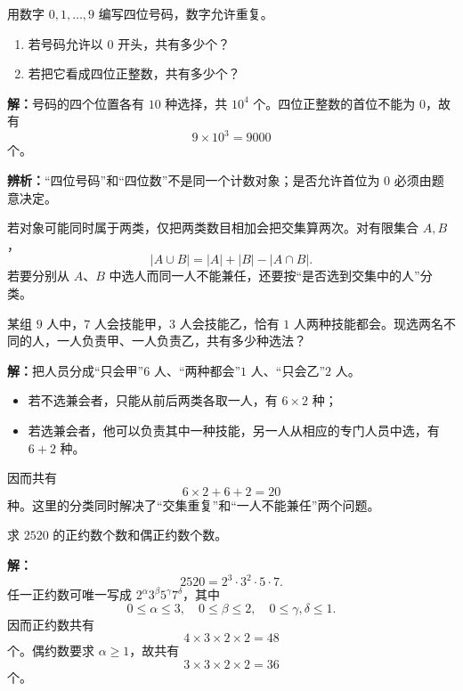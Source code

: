 \begin{examplebox}
  用数字 $0,1,\ldots,9$ 编写四位号码，数字允许重复。
  \begin{enumerate}
    \item 若号码允许以 $0$ 开头，共有多少个？
    \item 若把它看成四位正整数，共有多少个？
  \end{enumerate}

  \textbf{解：}号码的四个位置各有 $10$ 种选择，共 $10^4$ 个。四位正整数的首位不能为 $0$，故有
  \[
    9\times10^3=9000
  \]
  个。

  \textbf{辨析：}“四位号码”和“四位数”不是同一个计数对象；是否允许首位为 $0$ 必须由题意决定。
\end{examplebox}

\begin{corollarybox}[交集不能被重复计数]
  若对象可能同时属于两类，仅把两类数目相加会把交集算两次。对有限集合 $A,B$，
  \[
    |A\cup B|=|A|+|B|-|A\cap B|.
  \]
  若要分别从 $A$、$B$ 中选人而同一人不能兼任，还要按“是否选到交集中的人”分类。
\end{corollarybox}

\begin{examplebox}
  某组 $9$ 人中，$7$ 人会技能甲，$3$ 人会技能乙，恰有 $1$ 人两种技能都会。现选两名不同的人，一人负责甲、一人负责乙，共有多少种选法？

  \textbf{解：}把人员分成“只会甲”$6$ 人、“两种都会”$1$ 人、“只会乙”$2$ 人。
  \begin{itemize}
    \item 若不选兼会者，只能从前后两类各取一人，有 $6\times2$ 种；
    \item 若选兼会者，他可以负责其中一种技能，另一人从相应的专门人员中选，有 $6+2$ 种。
  \end{itemize}
  因而共有
  \[
    6\times2+6+2=20
  \]
  种。这里的分类同时解决了“交集重复”和“一人不能兼任”两个问题。
\end{examplebox}

\begin{examplebox}
  求 $2520$ 的正约数个数和偶正约数个数。

  \textbf{解：}
  \[
    2520=2^3\cdot3^2\cdot5\cdot7.
  \]
  任一正约数可唯一写成 $2^\alpha3^\beta5^\gamma7^\delta$，其中
  \[
    0\le\alpha\le3,\quad0\le\beta\le2,
    \quad0\le\gamma,\delta\le1.
  \]
  因而正约数共有
  \[
    4\times3\times2\times2=48
  \]
  个。偶约数要求 $\alpha\ge1$，故共有
  \[
    3\times3\times2\times2=36
  \]
  个。
\end{examplebox}

